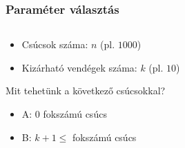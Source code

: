 \begin{frame}
\frametitle{Paraméter választás}

\begin{columns}
\begin{column}{0.5\textwidth}
\begin{footnotesize}
\begin{itemize}
\item Csúcsok száma: $n$ (pl. $1000$)
\item Kizárható vendégek száma: $k$ (pl. $10$)
\end{itemize}
\emptyline
Mit tehetünk a következő csúcsokkal?
\begin{itemize}
\item A: $0$ fokszámú csúcs\\
\item B: $k+1\leq$ fokszámú csúcs\\
\\
\end{itemize}
\end{footnotesize}
\end{column}


\end{columns}
\end{frame}
